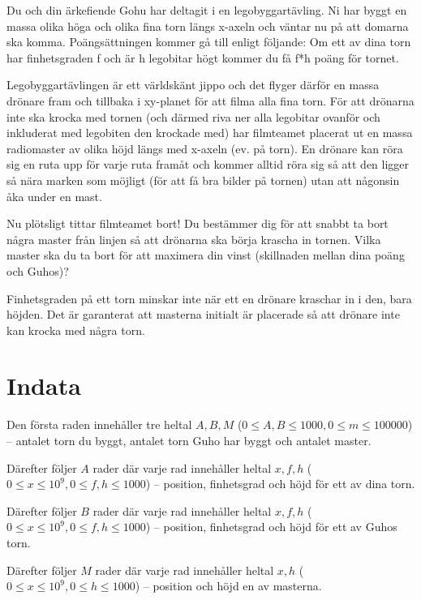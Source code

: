 

Du och din ärkefiende Gohu har deltagit i en legobyggartävling. Ni har byggt en massa olika höga och olika fina torn längs x-axeln och väntar nu på att domarna ska komma. Poängsättningen kommer gå till enligt följande: Om ett av dina torn har finhetsgraden f och är h legobitar högt kommer du få f*h poäng för tornet. 

Legobyggartävlingen är ett världskänt jippo och det flyger därför en massa drönare fram och tillbaka i xy-planet för att filma alla fina torn. För att drönarna inte ska krocka med tornen (och därmed riva ner alla legobitar ovanför och inkluderat med legobiten den krockade med) har filmteamet placerat ut en massa radiomaster av olika höjd längs med x-axeln (ev. på torn). En drönare kan röra sig en ruta upp för varje ruta framåt och kommer alltid röra sig så att den ligger så nära marken som möjligt (för att få bra bilder på tornen) utan att någonsin åka under en mast. 

Nu plötsligt tittar filmteamet bort! Du bestämmer dig för att snabbt ta bort några master från linjen så att drönarna ska börja krascha in tornen. Vilka master ska du ta bort för att maximera din vinst (skillnaden mellan dina poäng och Guhos)?

Finhetsgraden på ett torn minskar inte när ett en drönare kraschar in i den, bara höjden. Det är garanterat att masterna initialt är placerade så att drönare inte kan krocka med några torn.


\section*{Indata}
Den första raden innehåller tre heltal $A,B,M$ ($0 \leq A,B \leq 1000, 0 \leq m \leq 100 000$) -- antalet torn du byggt,  antalet torn Guho har byggt och antalet master.

Därefter följer $A$ rader där varje rad innehåller heltal $x,f,h$ ($0 \leq x \leq 10^9, 0\leq f,h \leq 1000$) -- position, finhetsgrad och höjd för ett av dina torn.

Därefter följer $B$ rader där varje rad innehåller heltal $x,f,h$ ($0 \leq x \leq 10^9, 0\leq f,h \leq 1000$) -- position, finhetsgrad och höjd för ett av Guhos torn.

Därefter följer $M$ rader där varje rad innehåller heltal $x,h$ ($0 \leq x \leq 10^9, 0\leq h \leq 1000$) -- position och höjd en av masterna.

